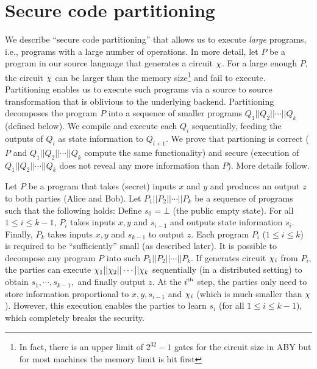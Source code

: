 \section{Secure code partitioning}
\label{sec:pipe}

We  describe ``secure code partitioning'' that allows us to execute {\it large} programs, i.e., programs with a large number of operations.
In more detail, let $P$ be a program in our source language that generates a circuit $\chi$. For a large enough $P$, the circuit $\chi$  can be larger than the memory size\footnote{In fact, there is an upper limit of $2^{32}-1$ gates for the circuit size in ABY but for most machines the memory limit is hit first} and fail to execute. Partitioning enables us to
execute such programs via a source to source transformation that is oblivious to the underlying \mpc backend. Partitioning decomposes the program $P$ into a sequence of smaller \tool programs $Q_1||Q_2||\cdots||Q_k$ (defined below). We compile and execute each $Q_i$ sequentially, feeding the outputs of $Q_i$ as state information to $Q_{i+1}$. We prove that partioning is correct ($P$ and $Q_1||Q_2||\cdots||Q_k$ compute the same functionality) and secure (execution of $Q_1||Q_2||\cdots||Q_k$ does not reveal any more information than $P$). More details follow.


Let $P$ be a program that takes (secret) inputs $x$ and $y$ and produces an output $z$ to both parties (Alice and Bob). Let $P_1||P_2||\cdots||P_k$ be a sequence of programs such that the following holds: Define $s_0 = \bot$ (the public empty state). For all $1\leq i\leq k-1$, $P_i$ takes inputs $x, y$ and $s_{i-1}$ and outputs  state information $s_i$. Finally, $P_k$ takes inputs $x,y$ and $s_{k-1}$ to  output $z$. Each program $P_i$ ($1\leq i\leq k$) is required to be ``sufficiently'' small (as described later). It is possible to decompose any program $P$  into such $P_1||P_2||\cdots||P_k$. If \tool generates circuit $\chi_i$ from $P_i$, the parties can execute $\chi_1||\chi_2||\cdots||\chi_k$ sequentially (in a distributed setting)  to obtain $s_1,\cdots,s_{k-1},$ and finally output $z$. At the $i^{\textrm{\tiny{th}}}$ step, the parties only need to store information proportional to $x,y,s_{i-1}$ and $\chi_i$ (which is much smaller than $\chi$). However, this execution enables the parties to learn $s_i$ (for all $1\leq i\leq k-1$), which completely breaks the security.

